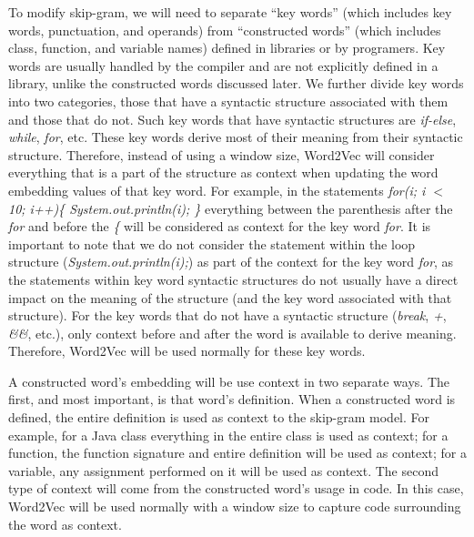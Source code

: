 To modify skip-gram, we will need to separate ``key words'' (which includes key words, punctuation, and operands) from ``constructed words'' (which includes class, function, and variable names) defined in libraries or by programers. Key words are usually handled by the compiler and are not explicitly defined in a library, unlike the constructed words discussed later. We further divide key words into two categories, those that have a syntactic structure associated with them and those that do not. Such key words that have syntactic structures are \textit{if-else}, \textit{while}, \textit{for}, etc. These key words derive most of their meaning from their syntactic structure. Therefore, instead of using a window size, Word2Vec will consider everything that is a part of the structure as context when updating the word embedding values of that key word. For example, in the statements \textit{for(i; i $<$ 10; i++)\{ System.out.println(i); \}} everything between the parenthesis after the \textit{for} and before the \textit{\{} will be considered as context for the key word \textit{for}. It is important to note that we do not consider the statement within the loop structure (\textit{System.out.println(i);}) as part of the context for the key word \textit{for}, as the statements within key word syntactic structures do not usually have a direct impact on the meaning of the structure (and the key word associated with that structure). For the key words that do not have a syntactic structure (\textit{break}, \textit{+}, \textit{\&\&}, etc.), only context before and after the word is available to derive meaning. Therefore, Word2Vec will be used normally for these key words.

A constructed word's embedding will be use context in two separate ways. The first, and most important, is that word's definition. When a constructed word is defined, the entire definition is used as context to the skip-gram model. For example, for a Java class everything in the entire class is used as context; for a function, the function signature and entire definition will be used as context; for a variable, any assignment performed on it will be used as context. The second type of context will come from the constructed word's usage in code. In this case, Word2Vec will be used normally with a window size to capture code surrounding the word as context.

